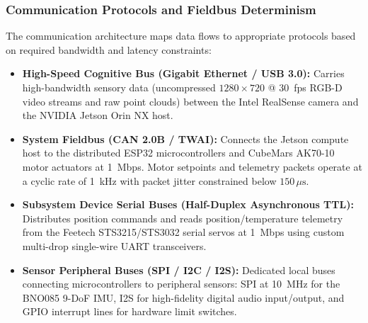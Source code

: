\subsubsection{Communication Protocols and Fieldbus Determinism}
The communication architecture maps data flows to appropriate protocols based on required bandwidth and latency constraints:
\begin{itemize}[leftmargin=1.5em]
  \item \textbf{High-Speed Cognitive Bus (Gigabit Ethernet / USB 3.0):} Carries high-bandwidth sensory data (uncompressed $1280 \times 720$ @ 30~fps RGB-D video streams and raw point clouds) between the Intel RealSense camera and the NVIDIA Jetson Orin NX host.
  \item \textbf{System Fieldbus (CAN 2.0B / TWAI):} Connects the Jetson compute host to the distributed ESP32 microcontrollers and CubeMars AK70-10 motor actuators at 1~Mbps. Motor setpoints and telemetry packets operate at a cyclic rate of 1~kHz with packet jitter constrained below $150\,\mu\text{s}$.
  \item \textbf{Subsystem Device Serial Buses (Half-Duplex Asynchronous TTL):} Distributes position commands and reads position/temperature telemetry from the Feetech STS3215/STS3032 serial servos at 1~Mbps using custom multi-drop single-wire UART transceivers.
  \item \textbf{Sensor Peripheral Buses (SPI / I2C / I2S):} Dedicated local buses connecting microcontrollers to peripheral sensors: SPI at 10~MHz for the BNO085 9-DoF IMU, I2S for high-fidelity digital audio input/output, and GPIO interrupt lines for hardware limit switches.
\end{itemize}

